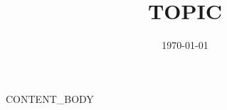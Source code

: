 \documentclass[11pt]{article}
\title{{{TOPIC}}}
\author{}
\date{\today}
\begin{document}
\maketitle

{{CONTENT_BODY}}
\end{document}
